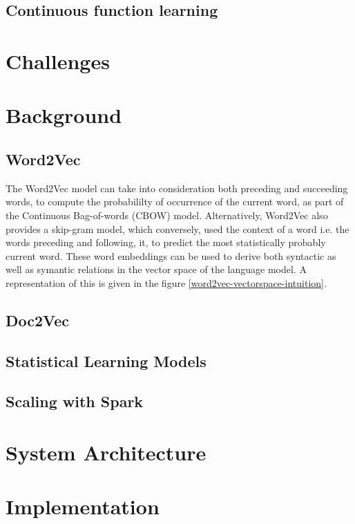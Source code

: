 \documentclass[conference]{IEEEtran}
\begin{document}
\subsection{Continuous function learning}


\section{Challenges}


\section{Background}

\subsection{Word2Vec} \label{Word2Vec}
The Word2Vec model\cite{mikolov2013efficient} can take into consideration both preceding and succeeding words, to compute the probabililty of occurrence of the current word, as part of the Continuous Bag-of-words (CBOW) model. Alternatively, Word2Vec also provides a skip-gram model, which conversely, used the context of a word i.e. the words preceding and following, it, to predict the most statistically probably current word. These word embeddings can be used to derive both syntactic as well as symantic relations in the vector space of the language model. A representation of this is given in the figure \ref{word2vec-vectorspace-intuition}.


\subsection{Doc2Vec}

\subsection{Statistical Learning Models}

\subsection{Scaling with Spark}


\section{System Architecture}


\section{Implementation}
\end{document}
